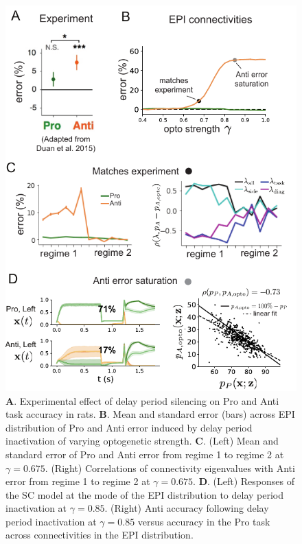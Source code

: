 \documentclass[11pt]{article}
\begin{document}
\begin{figure}
\begin{center}
\includegraphics[scale=1.]{figures/fig5/fig5.pdf}
\end{center}
\caption{\footnotesize 
\textbf{A}. Experimental effect of delay period silencing on Pro and Anti task accuracy in rats.
\textbf{B}. Mean and standard error (bars) across EPI distribution of Pro and Anti error induced by delay period inactivation of varying optogenetic strength.
\textbf{C}. (Left) Mean and standard error of Pro and Anti error from regime 1 to regime 2 at $\gamma = 0.675$.
(Right) Correlations of connectivity eigenvalues with Anti error from regime 1 to regime 2 at $\gamma = 0.675$.
\textbf{D}. (Left) Responses of the SC model at the mode of the EPI distribution to delay period inactivation at $\gamma = 0.85$.  (Right) Anti accuracy following delay period inactivation at $\gamma = 0.85$ versus accuracy in the Pro task across connectivities in the EPI distribution.
}
\label{fig:SC_opto}
\end{figure}
\end{document}
